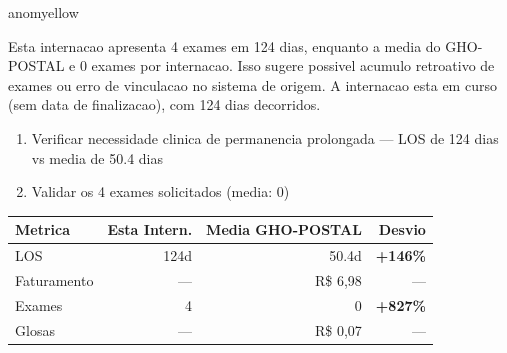 \documentclass[a4paper,10pt]{article}
\begin{document}
\begin{anomalycard}[Internacao 6006 | GHO-POSTAL | MODERADO (z=2.74)]{anomyellow}
\vspace{2pt}\begin{tcolorbox}[colback=severityred!20,colframe=anomyellow,title={\textbf{Interpretacao de Negocio}},fonttitle=\bfseries\small,left=4pt,right=4pt,top=3pt,bottom=3pt]
{\small Esta internacao apresenta 4 exames em 124 dias, enquanto a media do GHO-POSTAL e 0 exames por internacao. Isso sugere possivel acumulo retroativo de exames ou erro de vinculacao no sistema de origem. A internacao esta em curso (sem data de finalizacao), com 124 dias decorridos.}
\end{tcolorbox}
\begin{tcolorbox}[colback=severityyellow!30,colframe=anomorange,title={\textbf{Recomendacoes Especificas}},fonttitle=\bfseries\small,left=4pt,right=4pt,top=3pt,bottom=3pt]
\begin{enumerate}[nosep,leftmargin=16pt]
\item {\small Verificar necessidade clinica de permanencia prolongada --- LOS de 124 dias vs media de 50.4 dias}
\item {\small Validar os 4 exames solicitados (media: 0)}
\end{enumerate}
\end{tcolorbox}
\begin{center}\begin{tabular}{l r r r}\toprule\textbf{Metrica} & \textbf{Esta Intern.} & \textbf{Media GHO-POSTAL} & \textbf{Desvio} \\\midrule
LOS & 124d & 50.4d & \textcolor{anomred}{\textbf{+146\%}} \\
Faturamento & --- & R\$ 6,98 & --- \\
Exames & 4 & 0 & \textcolor{anomred}{\textbf{+827\%}} \\
Glosas & --- & R\$ 0,07 & --- \\
\bottomrule\end{tabular}\end{center}


\end{anomalycard}
\end{document}
